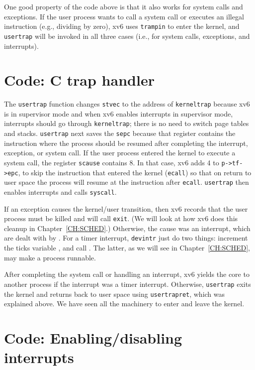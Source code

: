 One good property of the code above is that it also works for system
calls and exceptions.  If the user process wants to call a system call
or executes an illegal instruction (e.g., dividing by zero), xv6 uses
\lstinline{trampin} to enter the kernel, and \lstinline{usertrap} will
be invoked in all three cases (i.e., for system calls, exceptions, and
interrupts).

\section{Code: C trap handler}

The \lstinline{usertrap} function changes \lstinline{stvec} to the
address of \lstinline{kerneltrap} because xv6 is in supervisor mode and
when xv6 enables interrupts in supervisor mode, interrupts should go
through \lstinline{kerneltrap}; there is no need to switch page tables
and stacks. \lstinline{usertrap} next saves the \lstinline{sepc}
because that register contains the instruction where the process
should be resumed after completing the interrupt, exception, or system
call.  If the user process entered the kernel to execute a system
call, the register \lstinline{scause} contains 8.  In that case, xv6
adds 4 to \lstinline{p->tf->epc}, to skip the instruction that entered
the kernel (\lstinline{ecall}) so that on return to user space the
process will resume at the instruction after \lstinline{ecall}.
\lstinline{usertrap} then enables interrupts and calls
\lstinline{syscall}.

If an exception causes the kernel/user transition, then xv6 records
that the user process must be killed and will call \lstinline{exit}.
(We will look at how xv6 does this cleanup in Chapter~\ref{CH:SCHED}.)
Otherwise, the cause was an interrupt, which are dealt with by
.  For a timer
interrupt, \lstinline{devintr} just do two things: increment the ticks
variable , and call
.  The latter, as
we will see in Chapter~\ref{CH:SCHED}, may make a process runnable.

After completing the system call or handling an interrupt, xv6 yields
the core to another process if the interrupt was a timer interrupt.
Otherwise, \lstinline{usertrap} exits the kernel and returns back to
user space using \lstinline{usertrapret}, which was explained above.
We have seen all the machinery to enter and leave the kernel.
 
\section{Code: Enabling/disabling interrupts}

